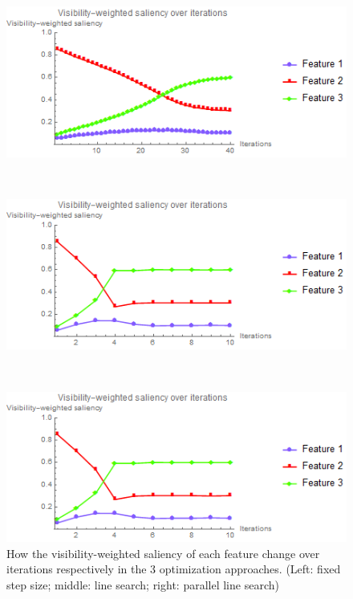 \begin{figure}
	\centering
	\begin{minipage}{.33\textwidth}
		\includegraphics[width=1\linewidth]{images/nucleon_strong_red_saliency_fixed}
	\end{minipage}~
	\begin{minipage}{.33\textwidth}
		\includegraphics[width=1\linewidth]{images/nucleon_strong_red_saliency_linesearch}
	\end{minipage}~
	\begin{minipage}{.33\textwidth}
		\includegraphics[width=1\linewidth]{images/nucleon_strong_red_saliency_parallelsearch}
	\end{minipage}
	\caption{How the visibility-weighted saliency of each feature change over iterations respectively in the 3 optimization approaches. (Left: fixed step size; middle: line search; right: parallel line search)}
	\label{fig:nucleon_strong_red_saliency}
\end{figure}

